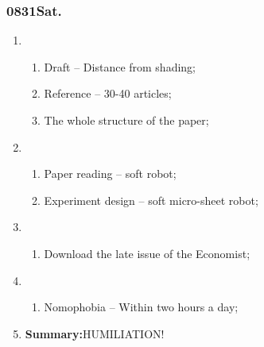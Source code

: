 \subsubsection{0831Sat.}
\begin{enumerate}
	\item \ncquaone
	\begin{enumerate}[(1)]
		\item Draft -- Distance from shading;\rightundoneBlack
		\item Reference -- 30-40 articles;\rightundoneBlack
		\item The whole structure of the paper;\rightundoneBlack
	\end{enumerate}
	
	\item \ncquatwo	
	\begin{enumerate}[(1)]
		\item Paper reading -- soft robot;\rightundoneBlack
		\item Experiment design -- soft micro-sheet robot;\rightundoneBlack
	\end{enumerate}
	
	\item \ncquathree
	\begin{enumerate}[(1)]
		\item Download the late issue of the Economist;\rightundoneBlack
	\end{enumerate}
	
	\item \ncquafour	
	\begin{enumerate}[(1)]
		\item Nomophobia -- Within two hours a day;\rightundoneBlack
	\end{enumerate}
	\item \textbf{Summary:}HUMILIATION! 
\end{enumerate}
